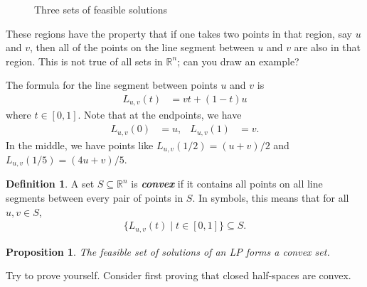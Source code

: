 \documentclass[a4paper, 12pt]{article}
\numberwithin{equation}{section}
\numberwithin{figure}{section}
\newtheorem{prop}[thm]{Proposition}
\theoremstyle{definition}
\newtheorem{defn}[thm]{Definition}
\newcommand{\R}{\mathbb{R}}
\newcommand{\define}[1]{\textbf{\textit{#1}}}
\begin{document}
\begin{figure}[h]
\begin{subfigure}{0.3\textwidth}
	\end{subfigure}
	\caption{Three sets of feasible solutions}
\end{figure}

These regions have the property that if one takes two points in that region, say
$u$ and $v$, then all of the points on the line segment between $u$ and $v$ are
also in that region. This is not true of all sets in $\R^n$; can you draw an
example? 

The formula for the line segment between points $u$ and $v$ is 
\begin{align*}
	L_{u,v}(t) &= vt + (1 - t)u
\end{align*}
where $t\in [0,1]$. Note that at the endpoints, we have 
\begin{align*}
	L_{u,v}(0) &= u, & L_{u,v}(1) &= v.
\end{align*}
In the middle, we have points like $L_{u,v}(1/2) = (u + v)/2$ and $L_{u,v}(1/5)
= (4u + v)/5$. 

\begin{defn}
	A set $S\subseteq \R^n$ is \define{convex} if it contains all points on all
	line segments between every pair of points in $S$. In symbols, this means
	that for all $u,v\in S$, 
	\begin{align*}
		\{L_{u,v}(t) \mid t\in [0,1]\} \subseteq S.
	\end{align*}
\end{defn}

\begin{prop}\label{prop:convex-LP}
	The feasible set of solutions of an LP forms a convex set. 
\end{prop}

Try to prove  yourself. Consider first proving that closed
half-spaces are convex. 
\end{document}

